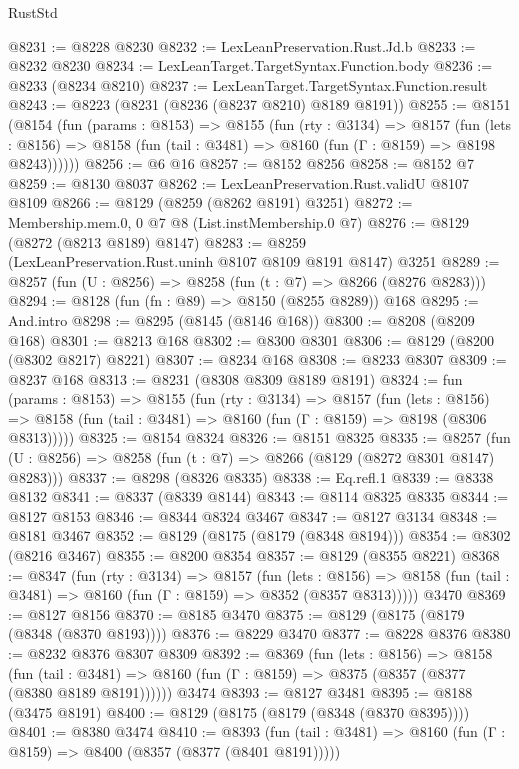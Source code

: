 \begin{lexlean}{RustStd}
\begin{coremodule}
@8231 := @8228 @8230
@8232 := LexLeanPreservation.Rust.Jd.b
@8233 := @8232 @8230
@8234 := LexLeanTarget.TargetSyntax.Function.body
@8236 := @8233 (@8234 @8210)
@8237 := LexLeanTarget.TargetSyntax.Function.result
@8243 := @8223 (@8231 (@8236 (@8237 @8210) @8189 @8191))
@8255 := @8151
    (@8154
      (fun (params : @8153) =>
      @8155
        (fun (rty : @3134) =>
        @8157
          (fun (lets : @8156) =>
          @8158 (fun (tail : @3481) => @8160 (fun (Γ : @8159) => @8198 @8243))))))
@8256 := @6 @16
@8257 := @8152 @8256
@8258 := @8152 @7
@8259 := @8130 @8037
@8262 := LexLeanPreservation.Rust.validU @8107 @8109
@8266 := @8129 (@8259 (@8262 @8191) @3251)
@8272 := Membership.mem.{0, 0} @7 @8 (List.instMembership.{0} @7)
@8276 := @8129 (@8272 (@8213 @8189) @8147)
@8283 := @8259 (LexLeanPreservation.Rust.uninh @8107 @8109 @8191 @8147) @3251
@8289 := @8257 (fun (U : @8256) => @8258 (fun (t : @7) => @8266 (@8276 @8283)))
@8294 := @8128 (fun (fn : @89) => @8150 (@8255 @8289)) @168
@8295 := And.intro
@8298 := @8295 (@8145 (@8146 @168))
@8300 := @8208 (@8209 @168)
@8301 := @8213 @168
@8302 := @8300 @8301
@8306 := @8129 (@8200 (@8302 @8217) @8221)
@8307 := @8234 @168
@8308 := @8233 @8307
@8309 := @8237 @168
@8313 := @8231 (@8308 @8309 @8189 @8191)
@8324 := fun (params : @8153) =>
  @8155
    (fun (rty : @3134) =>
    @8157
      (fun (lets : @8156) =>
      @8158 (fun (tail : @3481) => @8160 (fun (Γ : @8159) => @8198 (@8306 @8313)))))
@8325 := @8154 @8324
@8326 := @8151 @8325
@8335 := @8257 (fun (U : @8256) => @8258 (fun (t : @7) => @8266 (@8129 (@8272 @8301 @8147) @8283)))
@8337 := @8298 (@8326 @8335)
@8338 := Eq.refl.{1}
@8339 := @8338 @8132
@8341 := @8337 (@8339 @8144)
@8343 := @8114 @8325 @8335
@8344 := @8127 @8153
@8346 := @8344 @8324 @3467
@8347 := @8127 @3134
@8348 := @8181 @3467
@8352 := @8129 (@8175 (@8179 (@8348 @8194)))
@8354 := @8302 (@8216 @3467)
@8355 := @8200 @8354
@8357 := @8129 (@8355 @8221)
@8368 := @8347
    (fun (rty : @3134) =>
    @8157
      (fun (lets : @8156) =>
      @8158 (fun (tail : @3481) => @8160 (fun (Γ : @8159) => @8352 (@8357 @8313)))))
    @3470
@8369 := @8127 @8156
@8370 := @8185 @3470
@8375 := @8129 (@8175 (@8179 (@8348 (@8370 @8193))))
@8376 := @8229 @3470
@8377 := @8228 @8376
@8380 := @8232 @8376 @8307 @8309
@8392 := @8369
    (fun (lets : @8156) =>
    @8158
      (fun (tail : @3481) => @8160 (fun (Γ : @8159) => @8375 (@8357 (@8377 (@8380 @8189 @8191))))))
    @3474
@8393 := @8127 @3481
@8395 := @8188 (@3475 @8191)
@8400 := @8129 (@8175 (@8179 (@8348 (@8370 @8395))))
@8401 := @8380 @3474
@8410 := @8393
    (fun (tail : @3481) => @8160 (fun (Γ : @8159) => @8400 (@8357 (@8377 (@8401 @8191)))))

\end{coremodule}
\end{lexlean}
